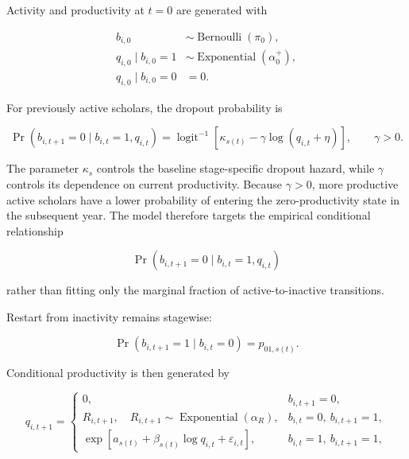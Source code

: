 \documentclass[twocolumn, letterpaper]{article}
\begin{document}
Activity and productivity at $t=0$ are generated with

\begin{equation}
    \begin{aligned}
    b_{i,0}
        &\sim \operatorname{Bernoulli}(\pi_0),\\[4pt]
    q_{i,0}\mid b_{i,0}=1
        &\sim \operatorname{Exponential}(\alpha_0^+),\\[4pt]
    q_{i,0}\mid b_{i,0}=0
        &=0.
    \end{aligned}
\label{eq:hurdle_ar1_s_p_a}
\end{equation}

For previously active scholars, the dropout probability is

\begin{equation}
    \Pr\left(
        b_{i,t+1}=0
        \mid
        b_{i,t}=1,q_{i,t}
    \right)
    =
    \operatorname{logit}^{-1}
    \left[
        \kappa_{s(t)}
        -
        \gamma\log(q_{i,t}+\eta)
    \right],
    \qquad \gamma>0.
\label{eq:hurdle_ar1_s_p_dropout}
\end{equation}

The parameter \(\kappa_s\) controls the baseline stage-specific dropout hazard, while \(\gamma\) controls its dependence on current productivity. Because \(\gamma>0\), more productive active scholars have a lower probability of entering the zero-productivity state in the subsequent year. The model therefore targets the empirical conditional relationship

\[
    \Pr\left(
        b_{i,t+1}=0
        \mid
        b_{i,t}=1,q_{i,t}
    \right)
\]

rather than fitting only the marginal fraction of active-to-inactive transitions.

Restart from inactivity remains stagewise:

\[
    \Pr\left(
        b_{i,t+1}=1
        \mid
        b_{i,t}=0
    \right)
    =
    p_{01,s(t)}.
\]

Conditional productivity is then generated by

\begin{equation}
    q_{i,t+1}
    =
    \begin{cases}
        0,
            & b_{i,t+1}=0, \\[4pt]
        R_{i,t+1},
        \quad
        R_{i,t+1}
        \sim
        \operatorname{Exponential}(\alpha_R),
            & b_{i,t}=0,\ b_{i,t+1}=1, \\[4pt]
        \exp\left[
            a_{s(t)}
            +\beta_{s(t)}\log q_{i,t}
            +\varepsilon_{i,t}
        \right],
            & b_{i,t}=1,\ b_{i,t+1}=1,
    \end{cases}
\label{eq:hurdle_ar1_s_p_b}
\end{equation}
\end{document}
